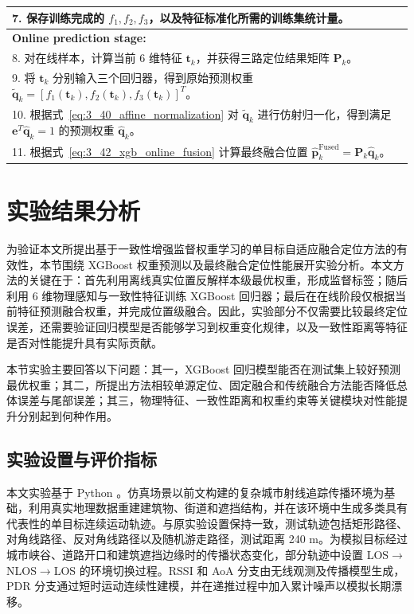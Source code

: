 \begin{table}[H]
\begin{tabular}{p{}}
7. 保存训练完成的 \(f_1,f_2,f_3\)，以及特征标准化所需的训练集统计量。\\
\midrule
\textbf{Online prediction stage:}\\
8. 对在线样本，计算当前 6 维特征 \(\mathbf{t}_k\)，并获得三路定位结果矩阵 \(\mathbf{P}_k\)。\\
9. 将 \(\mathbf{t}_k\) 分别输入三个回归器，得到原始预测权重 \(\tilde{\mathbf{q}}_k=[f_1(\mathbf{t}_k),f_2(\mathbf{t}_k),f_3(\mathbf{t}_k)]^T\)。\\
10. 根据式~\eqref{eq:3_40_affine_normalization} 对 \(\tilde{\mathbf{q}}_k\) 进行仿射归一化，得到满足 \(\mathbf{e}^T\hat{\mathbf{q}}_k=1\) 的预测权重 \(\hat{\mathbf{q}}_k\)。\\
11. 根据式~\eqref{eq:3_42_xgb_online_fusion} 计算最终融合位置 \(\hat{\mathbf{p}}_k^{\mathrm{Fused}}=\mathbf{P}_k\hat{\mathbf{q}}_k\)。\\
\bottomrule
\end{tabular}
\end{table}


\section{实验结果分析}
\label{sec:3_6}

为验证本文所提出基于一致性增强监督权重学习的单目标自适应融合定位方法的有效性，本节围绕 XGBoost 权重预测以及最终融合定位性能展开实验分析。本文方法的关键在于：首先利用离线真实位置反解样本级最优权重，形成监督标签；随后利用 6 维物理感知与一致性特征训练 XGBoost 回归器；最后在在线阶段仅根据当前特征预测融合权重，并完成位置级融合。因此，实验部分不仅需要比较最终定位误差，还需要验证回归模型是否能够学习到权重变化规律，以及一致性距离等特征是否对性能提升具有实际贡献。

本节实验主要回答以下问题：其一，XGBoost 回归模型能否在测试集上较好预测最优权重；其二，所提出方法相较单源定位、固定融合和传统融合方法能否降低总体误差与尾部误差；其三，物理特征、一致性距离和权重约束等关键模块对性能提升分别起到何种作用。

\subsection{实验设置与评价指标}
\label{subsec:3_6_1}

本文实验基于 Python 。仿真场景以前文构建的复杂城市射线追踪传播环境为基础，利用真实地理数据重建建筑物、街道和遮挡结构，并在该环境中生成多类具有代表性的单目标连续运动轨迹。与原实验设置保持一致，测试轨迹包括矩形路径、对角线路径、反对角线路径以及随机游走路径，测试距离 240 m。为模拟目标经过城市峡谷、道路开口和建筑遮挡边缘时的传播状态变化，部分轨迹中设置 LOS$\rightarrow$NLOS$\rightarrow$LOS 的环境切换过程。RSSI 和 AoA 分支由无线观测及传播模型生成，PDR 分支通过短时运动连续性建模，并在递推过程中加入累计噪声以模拟长期漂移。

